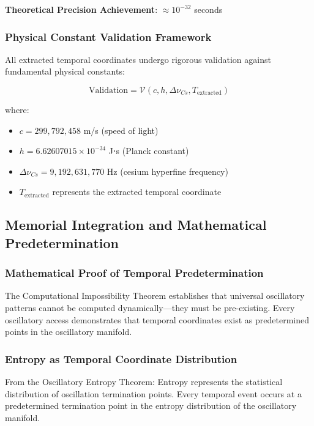 \documentclass[12pt,a4paper]{article}
\begin{document}
{\textbf{Theoretical Precision Achievement}: $\approx 10^{-32}$ seconds

\subsubsection{Physical Constant Validation Framework}

All extracted temporal coordinates undergo rigorous validation against fundamental physical constants:

\begin{equation}
\text{Validation} = \mathcal{V}(c, h, \Delta \nu_{Cs}, T_{\text{extracted}})
\end{equation}

where:
\begin{itemize}
\item $c = 299,792,458$ m/s (speed of light)
\item $h = 6.62607015 \times 10^{-34}$ J⋅s (Planck constant)
\item $\Delta \nu_{Cs} = 9,192,631,770$ Hz (cesium hyperfine frequency)
\item $T_{\text{extracted}}$ represents the extracted temporal coordinate
\end{itemize}

\subsection{Memorial Integration and Mathematical Predetermination}

\subsubsection{Mathematical Proof of Temporal Predetermination}

The Computational Impossibility Theorem establishes that universal oscillatory patterns cannot be computed dynamically—they must be pre-existing. Every oscillatory access demonstrates that temporal coordinates exist as predetermined points in the oscillatory manifold.

\subsubsection{Entropy as Temporal Coordinate Distribution}

From the Oscillatory Entropy Theorem: Entropy represents the statistical distribution of oscillation termination points. Every temporal event occurs at a predetermined termination point in the entropy distribution of the oscillatory manifold.

}
\end{document}
